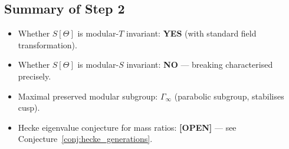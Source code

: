 \documentclass[12pt,a4paper]{article}
\theoremstyle{remark}
\begin{document}
\subsection{Summary of Step 2}

\begin{itemize}
  \item[\checkmark] Whether $S[\Theta]$ is modular-$T$ invariant:
        \textbf{YES} (with standard field transformation).
  \item[\checkmark] Whether $S[\Theta]$ is modular-$S$ invariant:
        \textbf{NO} — breaking characterised precisely.
  \item[\checkmark] Maximal preserved modular subgroup: $\Gamma_\infty$
        (parabolic subgroup, stabilises cusp).
  \item[$\square$] Hecke eigenvalue conjecture for mass ratios:
        \textbf{[OPEN]} — see Conjecture~\ref{conj:hecke_generations}.
\end{itemize}
\end{document}
